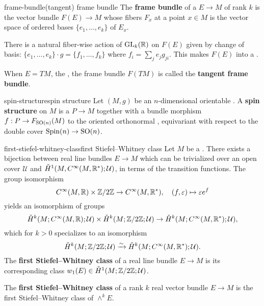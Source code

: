 \begin{topic}{frame-bundle}{(tangent) frame bundle}
    The \textbf{frame bundle} of a  $E \to M$ of rank $k$ is the vector bundle $F(E) \to M$ whose fibers $F_x$ at a point $x \in M$ is the vector space of ordered bases $\{ e_1, \ldots, e_k \}$ of $E_x$.
    
    There is a natural fiber-wise action of $\textup{GL}_k(\mathbb{R})$ on $F(E)$ given by change of basis: $\{ e_1, \ldots, e_k \} \cdot g = \{ f_1, \ldots, f_k \}$ where $f_i = \sum_j e_j g_{ji}$. This makes $F(E)$ into a .
    
    When $E = TM$, the , the frame bundle $F(TM)$ is called the \textbf{tangent frame bundle}.
\end{topic}

\begin{topic}{spin-structure}{spin structure}
    Let $(M, g)$ be an $n$-dimensional orientable . A \textbf{spin structure} on $M$ is a  $P \to M$ together with a bundle morphism $f : P \to F_{\textup{SO}(n)}(M)$ to the oriented orthonormal , equivariant with respect to the double cover $\textup{Spin}(n) \to \textup{SO}(n)$.
\end{topic}

\begin{topic}{first-stiefel-whitney-class}{first Stiefel--Whitney class}
    Let $M$ be a . There exists a bijection between real line bundles $E \to M$ which can be trivialized over an open cover $\mathcal{U}$ and $\check{H}^1(M, C^\infty(M, \mathbb{R}^*); \mathcal{U})$, in terms of the transition functions. The group isomorphism
    \[ C^\infty(M, \mathbb{R}) \times \mathbb{Z}/2\mathbb{Z} \to C^\infty(M, \mathbb{R}^*), \quad (f, \varepsilon) \mapsto \varepsilon e^f \]
    yields an isomorphism of  groups
    \[ \check{H}^k(M; C^\infty(M, \mathbb{R}); \mathcal{U}) \times \check{H}^k(M; \mathbb{Z}/2\mathbb{Z}; \mathcal{U}) \to \check{H}^k(M; C^\infty(M, \mathbb{R}^*); \mathcal{U}) , \]
    which for $k > 0$ specializes to an isomorphism
    \[ \check{H}^k(M; \mathbb{Z}/2\mathbb{Z}; \mathcal{U}) \xrightarrow{\sim} \check{H}^k(M; C^\infty(M, \mathbb{R}^*); \mathcal{U}) . \]
    The \textbf{first Stiefel--Whitney class} of a real line bundle $E \to M$ is its corresponding class $w_1(E) \in \check{H}^1(M; \mathbb{Z}/2\mathbb{Z}; \mathcal{U})$.
    
    The \textbf{first Stiefel--Whitney class} of a rank $k$ real vector bundle $E \to M$ is the first Stiefel--Whitney class of $\wedge^k E$.
\end{topic}

